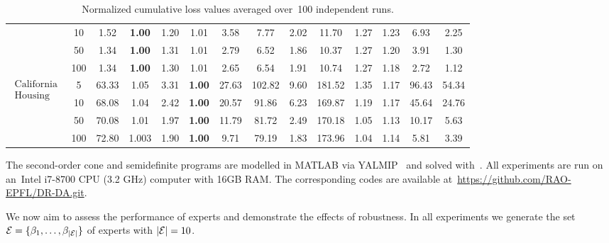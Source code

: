 \documentclass{article}
\begin{document}
\begin{table*}[h!]
\begin{tabular}{||c|c|c|c|c|c|c|c|c|c|c|c|c|c||}
    &10 &1.52 &\textbf{1.00}	&1.20 &1.01 &3.58 &7.77 &2.02 &11.70 &1.27 &1.23 &6.93 &2.25\\
    &50 &1.34 &\textbf{1.00} &1.31 &1.01 &2.79 &6.52 &1.86 &10.37 &1.27 &1.20 &3.91 &1.30\\
    &100 &1.34 &\textbf{1.00}	&1.30 &1.01 &2.65 &6.54 &1.91 &10.74 &1.27 &1.18 &2.72 &1.12\\
    \hline
    \hline
    \multirow{4}{*}{$\substack{\text{California}\\ \text{Housing}}$}  
    &5 &63.33 &1.05 &3.31 &\textbf{1.00} &27.63 &102.82 &9.60 &181.52 &1.35 &1.17 &96.43 &54.34\\
    &10 &68.08 &1.04 &2.42 &\textbf{1.00}	&20.57 &91.86 &6.23 &169.87 &1.19 &1.17 &45.64 &24.76\\
    &50 &70.08 &1.01	&1.97	&\textbf{1.00}	&11.79 &	81.72 &2.49 &170.18 &1.05 &1.13 &10.17 &5.63\\
    &100 & 72.80 &1.003 &1.90 &\textbf{1.00}	&9.71 &79.19 &1.83 &173.96 &1.04 &1.14 &5.81 &3.39\\
    \hline
    \hline
    \end{tabular} 
    \vspace{-.2cm}
    \caption{Normalized cumulative loss values averaged over~100 independent runs. }
    \vspace{-4mm}
    \label{tab:cum_loss_table}
\end{table*}

The second-order cone and semidefinite programs are modelled in MATLAB via YALMIP~\citep{ref:lofberg2004yalmip} and solved with~\citet{mosek}. All experiments are run on an~Intel i7-8700 CPU (3.2 GHz) computer with 16GB RAM. The corresponding codes are available at~\url{https://github.com/RAO-EPFL/DR-DA.git}.

We now aim to assess the performance of experts and demonstrate the effects of robustness.
In all experiments we generate the set $\mathcal E = \{\beta_1, \ldots, \beta_{|\mathcal E|}\}$ of experts with $|\mathcal E| = 10$. 
\end{document}
